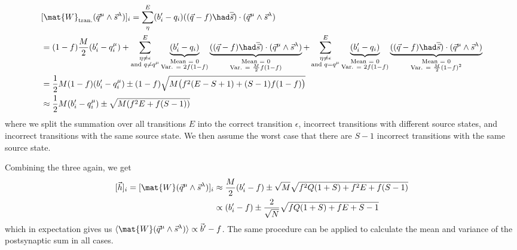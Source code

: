 \begin{equation}
\begin{split}
& [\mat{W}_\text{tran.}   (\vec{q}^\mu \land \vec{s}^\lambda)]_i  = \sum_\eta^E (b_i^\prime - q_i) ((\vec{q} - f) \had \overline{\vec{s}} ) \cdot (\vec{q}^\mu \land \vec{s}^\lambda) \\
& = (1-f)\frac{M}{2}(b_i^\prime - q_i^\mu) + \sum_{\substack{\eta\neq \epsilon \\ \text{and } q \neq q^\mu}}^E \underbrace{(b_i^\prime - q_i)}_{\substack{\text{Mean = 0} \\ \text{Var. = } 2f(1-f)}} \underbrace{((\vec{q} - f) \had \overline{\vec{s}} ) \cdot (\vec{q}^\mu \land \vec{s}^\lambda)}_{\substack{\text{Mean = 0} \\ \text{Var. = } \frac{M}{2} f(1-f) }} + \sum_{\substack{\eta\neq \epsilon \\ \text{and } q = q^\mu}}^E \underbrace{(b_i^\prime - q_i)}_{\substack{\text{Mean = 0} \\ \text{Var. = } 2f(1-f)}} \underbrace{((\vec{q} - f) \had \overline{\vec{s}} ) \cdot (\vec{q}^\mu \land \vec{s}^\lambda)}_{\substack{\text{Mean = 0} \\ \text{Var. = } \frac{M}{2} (1-f)^2 }}  \\
& = \frac{1}{2} M (1-f) (b_i^\prime - q_i^\mu) \pm (1-f)\sqrt{ M  \big( f^2 (E-S+1) + (S-1)f(1-f) \big)} \\
& \approx \frac{1}{2} M (b_i^\prime - q_i^\mu) \pm \sqrt{M( f^2E + f(S-1))}
\end{split}
\end{equation}
where we split the summation over all transitions $E$ into the correct transition $\epsilon$, incorrect transitions with different source states, and incorrect transitions with the same source state. We then assume the worst case that there are $S-1$ incorrect transitions with the same source state.

Combining the three again, we get
\begin{equation}
\begin{split}
[\vec{h}]_i = [\mat{W} (\vec{q}^\mu \land \vec{s}^\lambda)]_i & \approx \frac{M}{2} (b_i^\prime - f) \pm \sqrt{M}\sqrt{f^2 Q(1+S) + f^2E + f(S-1)} \\
& \propto (b_i^\prime -f ) \pm \frac{2}{\sqrt{N}} \sqrt{f Q(1+S) + fE + S-1}
\end{split}
\end{equation}
which in expectation gives us $\langle \mat{W} (\vec{q}^\mu \land \vec{s}^\lambda) \rangle \propto \vec{b}^\prime -f$. The same procedure can be applied to calculate the mean and variance of the postsynaptic sum in all cases.


